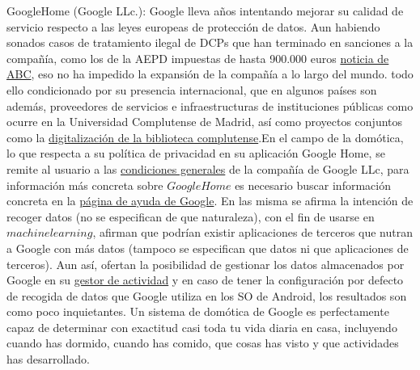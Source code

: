 \vspace{1.5cm}

GoogleHome (Google LLc.): Google lleva años intentando mejorar su calidad de servicio respecto a las leyes europeas de protección de datos. Aun habiendo sonados casos de tratamiento ilegal de DCPs que han terminado en sanciones a la compañía, como los de la AEPD impuestas de hasta 900.000 euros \href{https://www.abc.es/tecnologia/redes/20131219/abci-google-multa-aepd-201312191217.html}{noticia de ABC}, eso no ha impedido la expansión de la compañía a lo largo del mundo. todo ello condicionado por su presencia internacional, que en algunos países son además, proveedores de servicios e infraestructuras de instituciones públicas como ocurre en la Universidad Complutense de Madrid, así como proyectos conjuntos como la \href{https://biblioteca.ucm.es/google8}{digitalización de la biblioteca complutense}.En el campo de la domótica, lo que respecta a su política de privacidad en su aplicación Google Home, se remite al usuario a las \href{https://policies.google.com/privacy?hl=es}{condiciones generales} de la compañía de Google LLc, para información más concreta sobre $Google Home$ es necesario buscar información concreta en la \href{https://support.google.com/googlehome/answer/7072285?hl=es&ref_topic=7173611}{página de ayuda de Google}. En las misma se afirma la intención de recoger datos (no se especifican de que naturaleza), con el fin de usarse en $machine learning$, afirman que podrían existir aplicaciones de terceros que nutran a Google con más datos (tampoco se especifican que datos ni que aplicaciones de terceros). Aun así, ofertan la posibilidad de gestionar los datos almacenados por Google en su \href{https://myactivity.google.com/}{gestor de actividad} y en caso de tener la configuración por defecto de recogida de datos que Google utiliza en los SO de Android, los resultados son como poco inquietantes. Un sistema de domótica de Google es perfectamente capaz de determinar con exactitud casi toda tu vida diaria en casa, incluyendo cuando has dormido, cuando has comido, que cosas has visto y que actividades has desarrollado.

\vspace{1.5cm}

